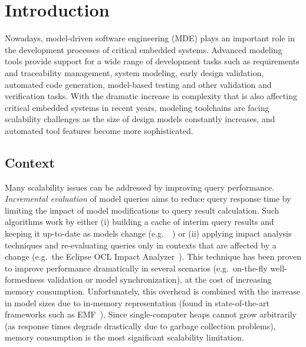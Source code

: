 \chapter{Introduction}
\label{chap:introduction}

Nowadays, model-driven software engineering (MDE) plays an important role in the development processes of critical embedded systems. Advanced modeling tools provide support for a wide range of development tasks such as requirements and traceability management, system modeling, early design validation, automated code generation, model-based testing and other validation and verification tasks. 
With the dramatic increase in complexity that is also affecting critical embedded systems in recent years, modeling toolchains are facing scalability challenges as the size of design models constantly increases, and automated tool features become more sophisticated.

\section{Context}

Many scalability issues can be addressed by improving query performance. \emph{Incremental evaluation} of model queries aims to reduce query response time by limiting the impact of model modifications to query result calculation. Such algorithms work by either (i) building a cache of interim query results and keeping it up-to-date as models change (e.g.\ \eiq{}~\cite{models10}) or (ii) applying impact analysis techniques and re-evaluating queries only in contexts that are affected by a change (e.g.\ the Eclipse OCL Impact Analyzer~\cite{OCLIA}). This technique has been proven to improve performance dramatically in several scenarios (e.g.\ on-the-fly well-formedness validation or model synchronization), at the cost of increasing memory consumption. Unfortunately, this overhead is combined with the increase in model sizes due to in-memory representation (found in state-of-the-art frameworks such as EMF~\cite{EMF}). Since single-computer heaps cannot grow arbitrarily (as response times degrade drastically due to garbage collection problems), memory consumption is the most significant scalability limitation.%


